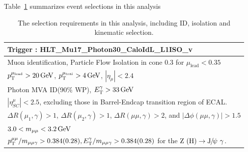		Table~\ref{tab:FullSelec} summarizes event selections in this analysis
		\begin{table}[!ht]
		    \begin{center}
		    \begin{tabular}{l}
		      \hline
		      Trigger : HLT\_Mu17\_Photon30\_CaloIdL\_L1ISO\_v\* \\
		      \hline
		      Muon identification,  Particle Flow Isolation in cone 0.3 for $\mu_{\text{lead}} < 0.35$\\ 
		      $p_{\mathrm{T}}^{\mu_{\text{lead}}} > 20\,\text{Ge\hspace{-.08em}V}$, $p_{\mathrm{T}}^{\mu_{\text{trai}}} > 4\,\text{Ge\hspace{-.08em}V}$, $|\eta_{\mu}| < 2.4$ \\
		      \hline
		      Photon MVA ID(90$\%$ WP), $E_{\mathrm{T}}^{\gamma} > 33\,\text{Ge\hspace{-.08em}V}$ \\
		      $|\eta_{SC}^{\mu}| < 2.5$, excluding those in Barrel-Endcap transition region of ECAL.\\
		      \hline
		      $\Delta R(\mu_{1},\gamma) > 1$, $\Delta R(\mu_{2},\gamma) > 1$, $\Delta R(\mu\mu,\gamma) > 2$, and $|\Delta\phi(\mu\mu,\gamma)| > 1.5$ \\
		      \hline
		      $3.0 < m_{\mu\mu} < 3.2\,\text{Ge\hspace{-.08em}V}$ \\
		      \hline
		      $p_{\mathrm{T}}^{\mu\mu} / m_{\mu\mu\gamma} >  0.384 (0.28), E_{\mathrm{T}}^{\gamma} / m_{\mu\mu\gamma} > 0.384  (0.28)$ for the $\cPZ\ (\PH)\to\JPsi\ \gamma$. \\
		      \hline
		    \end{tabular}
		    \caption{The selection requirements in this analysis, including ID, isolation and kinematic selection.\label{tab:FullSelec}}
		    \end{center}
		\end{table}
		
